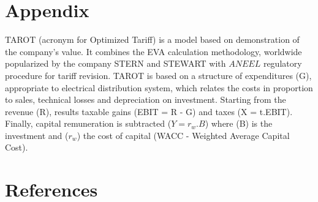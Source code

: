 \documentclass[preprint,12pt]{elsarticle}
\begin{document}
\section{Appendix}
\label{S.6}

TAROT (acronym for Optimized Tariff) is a model based on demonstration of the company's value. It combines the EVA calculation methodology, worldwide popularized by the company STERN and STEWART with $ANEEL$ regulatory procedure for tariff revision.
TAROT is based on a structure of expenditures (G), appropriate to electrical distribution system, which relates the costs in proportion to sales, technical losses and depreciation on investment.  Starting from the revenue (R), results taxable gains (EBIT = R - G) and taxes (X = t.EBIT).
Finally, capital remuneration is subtracted ($Y = r_w.B$) where (B) is the investment and ($r_w$) the cost of capital (WACC - Weighted Average Capital Cost).\\


\section{References}
\label{S.7}









\end{document}
